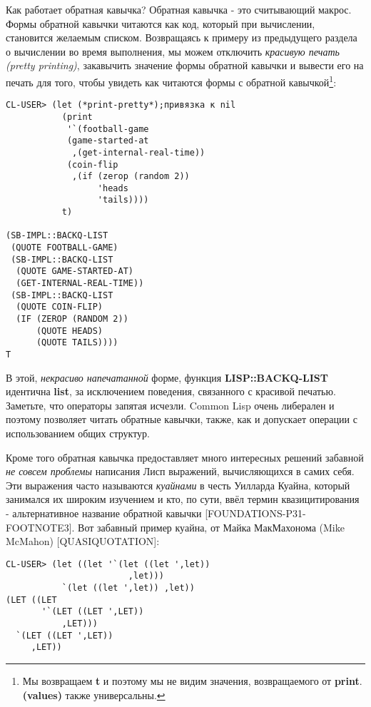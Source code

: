 Как работает обратная кавычка? Обратная кавычка - это считывающий макрос. Формы обратной кавычки читаются как код, который при вычислении, становится желаемым списком. Возвращаясь к примеру из предыдущего раздела о вычислении во время выполнения, мы можем отключить \emph{красивую печать (pretty printing)}, закавычить значение формы обратной кавычки и вывести его на печать для того, чтобы увидеть как читаются формы с обратной кавычкой\footnote{Мы возвращаем \textbf{t} и поэтому мы не видим значения, возвращаемого от \textbf{print}. \textbf{(values)} также универсальны.}:

\begin{verbatim}
CL-USER> (let (*print-pretty*);привязка к nil
           (print
            '`(football-game
            (game-started-at
             ,(get-internal-real-time))
            (coin-flip
             ,(if (zerop (random 2))
                  'heads
                  'tails))))
           t)

(SB-IMPL::BACKQ-LIST 
 (QUOTE FOOTBALL-GAME) 
 (SB-IMPL::BACKQ-LIST 
  (QUOTE GAME-STARTED-AT) 
  (GET-INTERNAL-REAL-TIME)) 
 (SB-IMPL::BACKQ-LIST 
  (QUOTE COIN-FLIP) 
  (IF (ZEROP (RANDOM 2)) 
      (QUOTE HEADS) 
      (QUOTE TAILS)))) 
T
\end{verbatim}

В этой, \emph{некрасиво напечатанной} форме, функция {\textbf{LISP::BACKQ-LIST}} идентична \textbf{list}, за исключением поведения, связанного с красивой печатью. Заметьте, что операторы запятая исчезли. Common Lisp очень либерален и поэтому позволяет читать обратные кавычки, также, как и допускает операции с использованием общих структур.

Кроме того обратная кавычка предоставляет много интересных решений забавной \emph{не совсем проблемы} написания Лисп выражений, вычисляющихся в самих себя. Эти выражения часто называются \emph{куайнами} в честь Уилларда Куайна, который занимался их широким изучением и кто, по сути, ввёл термин квазицитирования - альтернативное название обратной кавычки [FOUNDATIONS-P31-FOOTNOTE3]. Вот забавный пример куайна, от Майка МакМахонома (Mike McMahon) { [QUASIQUOTATION]}:

\begin{verbatim}
CL-USER> (let ((let '`(let ((let ',let))
                        ,let)))
           `(let ((let ',let)) ,let))
(LET ((LET
       '`(LET ((LET ',LET))
           ,LET)))
  `(LET ((LET ',LET))
     ,LET))
\end{verbatim}

